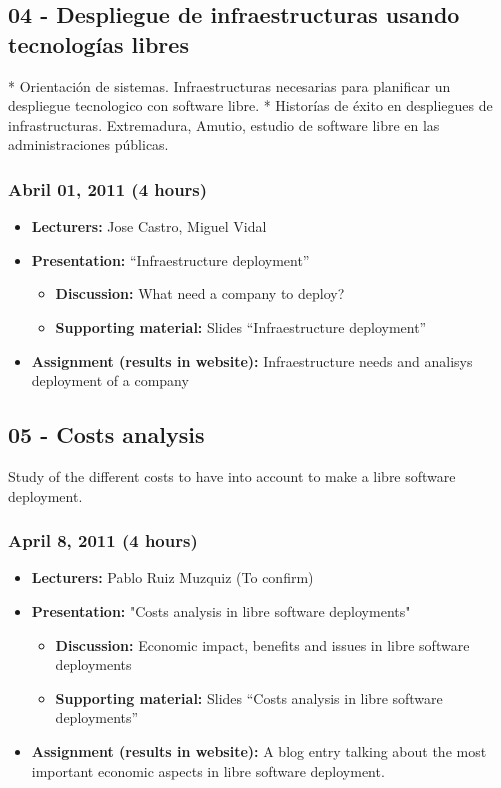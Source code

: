 \documentclass[a4paper]{article}
\begin{document}
\subsection{04 - Despliegue de infraestructuras usando tecnologías libres}

 * Orientación de sistemas. Infraestructuras necesarias para planificar un despliegue tecnologico con software libre. 
 * Historías de éxito en despliegues de infrastructuras. Extremadura, Amutio, estudio de software libre en las administraciones públicas.

\subsubsection{Abril 01, 2011 (4 hours)}


\begin{itemize}
\item \textbf{Lecturers:} Jose Castro, Miguel Vidal
\item \textbf{Presentation:} ``Infraestructure deployment''
  \begin{itemize}
  \item \textbf{Discussion:} What need a company to deploy?
  \item \textbf{Supporting material:} Slides ``Infraestructure deployment''
  \end{itemize}
\item \textbf{Assignment (results in website):} Infraestructure needs and analisys deployment of a company
\end{itemize}


\subsection{05 - Costs analysis }

Study of the different costs to have into account to make a libre software deployment. 

\subsubsection{April 8, 2011 (4 hours)}

\begin{itemize}
\item \textbf{Lecturers:} Pablo Ruiz Muzquiz (To confirm)
\item \textbf{Presentation:} "Costs analysis in libre software deployments"
  \begin{itemize}
  \item \textbf{Discussion:} Economic impact, benefits and issues in libre software deployments
  \item \textbf{Supporting material:} Slides ``Costs analysis in libre software deployments''
  \end{itemize}
\item \textbf{Assignment (results in website):} A blog entry talking about the most important economic aspects in libre software deployment.
\end{itemize}
\end{document}
